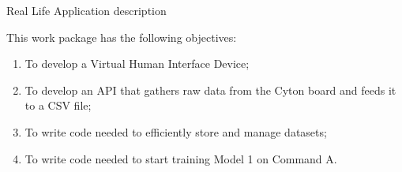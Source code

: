 
\begin{workpackage}{Real Life Application}
  \label{wp:app} %
description



  \makewptable %
    
  \begin{wpobjectives}
    This work package has the following objectives:
    \begin{enumerate}
    \item To develop a Virtual Human Interface Device;
    \item To develop an  API that gathers raw data from the Cyton board and feeds it 
to a CSV file;
    \item To write code needed to efficiently store and manage datasets;
    \item To write code needed to start training Model 1 on Command A.
    \end{enumerate}
  \end{wpobjectives}
  
  \begin{wpdescription}
 

    
  \end{wpdescription}
  

\end{workpackage}
